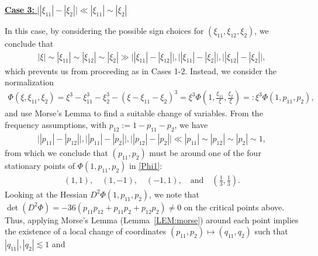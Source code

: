 \documentclass[%
11pt,  reqno]{amsart}
\newcommand{\5}{\textup{V}}
\newcommand{\noi}{\noindent}
\newcommand{\les}{\lesssim}
\theoremstyle{remark}
\newcommand{\ld}{\lambda}
\numberwithin{equation}{section}
\numberwithin{theorem}{section}
\begin{document}
\smallskip

\noi
\underline{\textbf{Case 3:}  $\big| |\xi_{11}| - |\xi_2| \big| \ll |\xi_{11}| \sim |\xi_2|$}

In this case, by considering the possible sign choices for $(\xi_{11}, \xi_{12}, \xi_2)$, we conclude that
\begin{align}
|\xi| \sim |\xi_{11}| \sim |\xi_{12}| \sim |\xi_2| \gg \big| |\xi_{11}| -| \xi_{12}| \big|, \big| |\xi_{11}| -| \xi_{2}| \big|, \big| |\xi_{12}| -| \xi_{2}| \big| ,
\end{align}
which prevents us from proceeding as in Cases 1-2. Instead, we consider the normalization
\begin{align}\label{Phi1}
\Phi(\xi, \xi_{11}, \xi_2) = \xi^3 - \xi_{11}^3 - \xi_2^3 - (\xi - \xi_{11} - \xi_2)^3  = \xi^3 \Phi(1, \tfrac{\xi_{11}}{\xi}, \tfrac{\xi_2}{\xi}) =: \xi^3 \Phi(1, p_{11}, p_2), 
\end{align}
and use Morse's Lemma to find a suitable change of variables.
From the frequency assumptions, with $p_{12}:= 1 - p_{11} - p_2$, we have 
\begin{align}
\big| |p_{11}| - |p_{12}| \big|, 
\big| |p_{11}| - |p_2| \big|,
\big| |p_{12}| - |p_2| \big|
 \ll |p_{11}| \sim |p_{12} | \sim |p_2|  \sim 1, 
\end{align}
from which we conclude that 
$(p_{11}, p_2)$ must be around one of the four stationary points of $\Phi(1, p_{11}, p_2)$ in \eqref{Phi1}:
\begin{align}
(1, 1), 
\quad
(1, -1), 
\quad 
(-1,1), 
\quad 
\text{and}
\quad 
(\tfrac13, \tfrac13). 
\end{align}
Looking at the Hessian $D^2 \Phi(1, p_{11}, p_2)$, we note that $\det (D^2 \Phi) = -36 (p_{11} p_{12} + p_{11} p_2 + p_{12} p_2) \ne0 $ on the critical points above. Thus, applying Morse's Lemma (Lemma~\ref{LEM:morse}) around each point implies the existence of a local change of coordinates $(p_{11},p_2) \mapsto (q_{11}, q_2)$ such that $|q_{11}|, |q_2| \les 1$ and 
\end{document}
